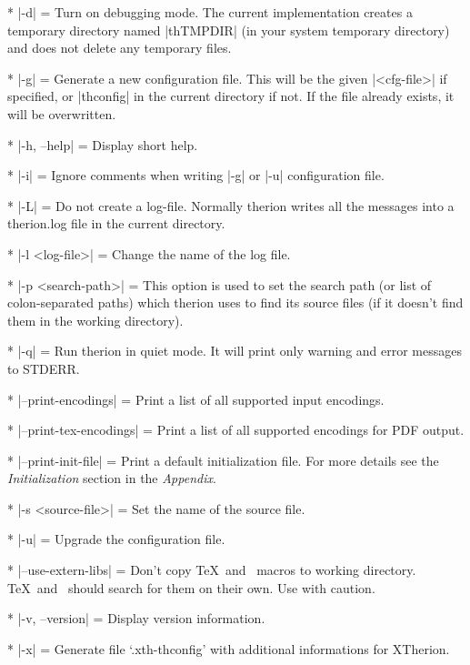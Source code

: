 \options
* |-d| =
  Turn on debugging mode. The current implementation creates a 
  temporary directory named |thTMPDIR| (in your system temporary 
  directory) and does not delete any temporary files. 

* |-g| =
  Generate a new configuration file. This will be the given 
  |<cfg-file>| if specified, or |thconfig| in the current directory if not. 
  If the file already exists, it will be overwritten.
        
* |-h, --help| =
        Display short help.

* |-i| =
        Ignore comments when writing |-g| or |-u| configuration file.

* |-L| =
        Do not create a log-file. Normally therion writes all the messages
        into a therion.log file in the current directory.
        
* |-l <log-file>| =
        Change the name of the log file.
        
* |-p <search-path>| =
        This option is used to set the search path (or list of 
	colon-separated paths) which therion uses to find its source
        files (if it doesn't find them in the working directory).

* |-q| =
        Run therion in quiet mode. It will print only warning
        and error messages to STDERR.

* |--print-encodings| =
        Print a list of all supported input encodings.
        
* |--print-tex-encodings| =
        Print a list of all supported encodings for PDF output.
        
* |--print-init-file| =
        Print a default initialization file. For more details
        see the {\it Initialization} section in the {\it Appendix}.
        
* |-s <source-file>| =
        Set the name of the source file.
        
* |-u| =
        Upgrade the configuration file.

* |--use-extern-libs| =
  Don't copy \TeX\ and \MP\ macros to working directory. \TeX\ and \MP\ 
  should search for them on their own. Use with caution.

* |-v, --version| =
  Display version information.        
        
* |-x| =
  Generate file `.xth-thconfig' with additional informations for XTherion.
\endoptions

